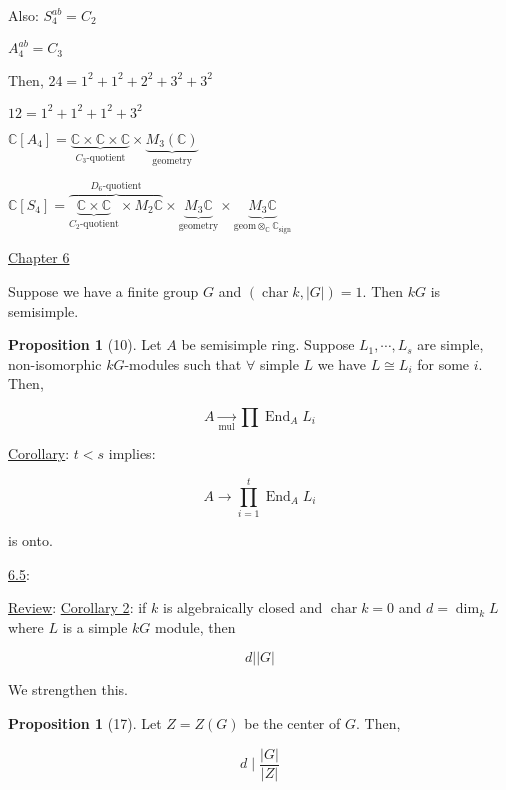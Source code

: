 \documentclass{article}
\theoremstyle{definition}
\newtheorem{proposition}[theorem]{Proposition}
\newcommand{\Char}{\operatorname{char}}
\begin{document}
Also: \(S_4^{ab} = C_2\) 

\(A_4^{ab} = C_3\)

Then, \(24 = 1^2 + 1^2 + 2^2 + 3^2 + 3^2\) 

\(12 = 1^2 + 1^2 + 1^2 + 3^2\)

\(\mathbb{C} [A_4] = \underbrace{\mathbb{C} \times \mathbb{C} \times \mathbb{C}}_{C_3 \text{-quotient}} \times \underbrace{M_3(\mathbb{C})}_{\text{geometry}}\) 

\(\mathbb{C} [S_4] = \overbrace{\underbrace{\mathbb{C} \times \mathbb{C}}_{C_2 \text{-quotient}}\times M_2\mathbb{C}}^{D_6 \text{-quotient}} \times \underbrace{M_3\mathbb{C}}_{\text{geometry}} \times \underbrace{M_3 \mathbb{C}}_{\text{geom}\otimes_\mathbb{C}\mathbb{C}_{\text{sign}}}  \) 

\underline{Chapter 6} 

Suppose we have a finite group \(G\) and \((\Char k, \vert G \vert)=1\). Then \(kG\) is semisimple.

\begin{proposition}
    [10] Let \(A\) be semisimple ring. Suppose \(L_1, \cdots , L_s\) are simple, non-isomorphic \(kG\)-modules such that \(\forall\) simple \(L\) we have \(L\cong L_i\) for some \(i\). Then,

    \[
        A\underset{\text{mul}}{\longrightarrow}  \prod \operatorname{End}_A L_i
    \]

\end{proposition}

\underline{Corollary}: \(t < s\) implies:

\[
    A \to \prod_{i=1}^t \operatorname{End}_A L_i
\]

is onto.

\underline{6.5}: 

\underline{Review}: \underline{Corollary 2}: if \(k\) is algebraically closed and \(\Char k = 0\) and \(d = \dim_k L\) where \(L\) is a simple \(kG\) module, then

\[
    d \mid \vert G \vert 
\]

We strengthen this.

\begin{proposition}
    [17] Let \(Z = Z(G)\) be the center of \(G\). Then,

    \[
        d \mid \frac{\vert G \vert}{\vert Z \vert}
    \]
\end{proposition}
\end{document}
